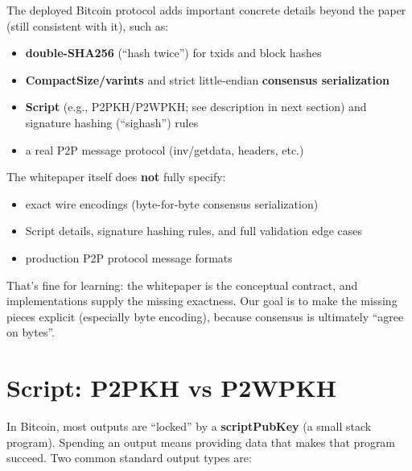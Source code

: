 The deployed Bitcoin protocol adds important concrete details beyond the paper (still consistent with it), such as:

\begin{itemize}
  \item \textbf{double-SHA256} (``hash twice'') for txids and block hashes
  \item \textbf{CompactSize/varints} and strict little-endian \textbf{consensus serialization}
  \item \textbf{Script} (e.g., P2PKH/P2WPKH; see description in next section) and signature hashing (``sighash'') rules
  \item a real P2P message protocol (inv/getdata, headers, etc.)
\end{itemize}

The whitepaper itself does \textbf{not} fully specify:

\begin{itemize}
  \item exact wire encodings (byte-for-byte consensus serialization)
  \item Script details, signature hashing rules, and full validation edge cases
  \item production P2P protocol message formats
\end{itemize}

That's fine for learning: the whitepaper is the conceptual contract, and implementations supply the missing exactness. Our goal is to make the missing pieces explicit (especially byte encoding), because consensus is ultimately ``agree on bytes''.

\section{Script: P2PKH vs P2WPKH}
\label{sec:p2pkh-p2wpkh}

In Bitcoin, most outputs are ``locked'' by a \textbf{scriptPubKey} (a small stack program). Spending an output means providing data that makes that program succeed. Two common standard output types are:

